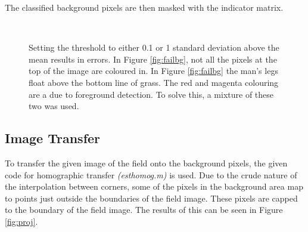\documentclass[11pt]{article}
\begin{document}
The classified background pixels are then masked with the indicator matrix.

\begin{figure}
  \centering
   ~
  \caption{Setting the threshold to either 0.1 or 1 standard deviation above the mean results in errors. In Figure \ref{fig:failbg}, not all the pixels at the top of the image are coloured in. In Figure \ref{fig:failbg} the man's legs float above the bottom line of grass. The red and magenta colouring are a due to foreground detection. To solve this, a mixture of these two was used.}
  \label{fig:failing}
\end{figure}

\subsection{Image Transfer}

To transfer the given image of the field onto the background pixels, the given code for homographic transfer \emph{(esthomog.m)} is used. Due to the crude nature of the interpolation between corners, some of the pixels in the background area map to points just outside the boundaries of the field image. These pixels are capped to the boundary of the field image. The results of this can be seen in Figure \ref{fig:proj}.
\end{document}

